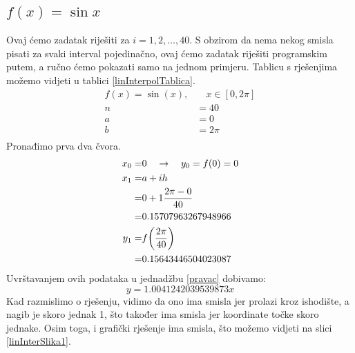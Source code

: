 \documentclass[12pt,a4paper]{report}
\begin{document}
		\subsection{$f(x)=\sin x$}
			Ovaj ćemo zadatak riješiti za $i=1, 2,\ldots, 40$. S obzirom da nema nekog smisla pisati za svaki interval pojedinačno, ovaj ćemo zadatak riješiti programskim putem, a ručno ćemo pokazati samo na jednom primjeru. Tablicu s rješenjima možemo vidjeti u tablici \ref{linInterpolTablica}.
			\begin{align*}
				f(x)=\sin (x),& \quad x\in [0, 2\pi]\\
				n&=40\\
				a&=0\\
				b&=2\pi\\
			\end{align*}
			Pronađimo prva dva čvora. %
%	
%	
			\begin{align*}
				x_0=&0\quad\rightarrow \quad y_0=f(0)=0\\
				x_1=&a+ih\\=&0+1\frac{2\pi-0}{40}\\
					=&0.15707963267948966\\
				y_1=&f\biggr{(}\frac{2\pi}{40}\biggr{)}\\=&0.15643446504023087
			\end{align*}
			Uvrštavanjem ovih podataka u jednadžbu \ref{pravac} dobivamo:
			\begin{equation}
				y=1.0041242039539873x
				\label{linInt1}
			\end{equation}
			Kad razmislimo o rješenju, vidimo da ono ima smisla jer prolazi kroz ishodište, a nagib je skoro jednak 1, što također ima smisla jer koordinate točke skoro jednake. Osim toga, i grafički rješenje ima smisla, što možemo vidjeti na slici \ref{linInterSlika1}.
\end{document}
